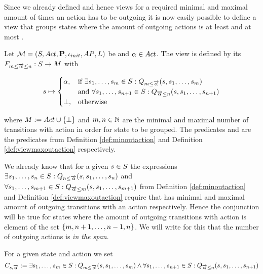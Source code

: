 \documentclass[preview]{standalone}
\begin{document}
Since we already defined \grpfctsN and hence views for a required minimal and maximal amount of times an action has to be outgoing it is now easily possible to define a view that groups states where the amount of outgoing actions is at least \numoutact and at most \numoutactb. 

\begin{definition}
	Let $\chgph = \chgphtuple$ be \achgphN and $\action \in \actions$. The view 
	\viewspanoutaction is defined by its \grpfctN $\gfctspanoutaction : \states \to \arbset$ with
	
	\[
	\state \mapsto
	\begin{cases}
		\action,				& \text{if } \exists \state_1, \dots, \state_\numoutactb \in \states: \predminoutact[\numoutactb] \\ &\text{and } \forall \state_1, \dots, \state_{\numoutact+1} \in \states: \predmaxoutact \\
		\remelem,          	& \text{otherwise}
	\end{cases}
	\]
	
	where $\imggrp := \actions \cup \remset$ and $\numoutactb, \numoutact \in \natnums$ are the minimal and maximal number of transitions with action \action in order for state to be grouped. The predicates \predminoutact and \predmaxoutact are the predicates from Definition \ref{def:minoutaction} and Definition \ref{def:viewmaxoutaction} respectively.
\end{definition}

We already know that for a given $\state \in \states$ the expressions $\exists \state_1, \dots, \state_\numoutact \in \states: \predminoutact$ and $\forall \state_1, \dots, \state_{\numoutactb+1} \in \states: \predmaxoutact[\numoutactb]$ from Definition \ref{def:minoutaction} and Definition \ref{def:viewmaxoutaction} require that \state has minimal and maximal amount of outgoing transitions with an action \action respectively. Hence the conjunction will be true for states where the amount of outgoing transitions with action \action is element of the set $\{\numoutactb, \numoutact+1, \dots, \numoutact-1, \numoutact\}$. We will write for this that the number of outgoing actions is \emph{in the span}.

For a given state \state and action \action we set
\[
\formoutact:= \exists \state_1, \dots, \state_\numoutactb \in \states: \predminoutact[\numoutactb]\land \\
\forall \state_1, \dots, \state_{\numoutact+1} \in \states: \predmaxoutact
\]
\end{document}
